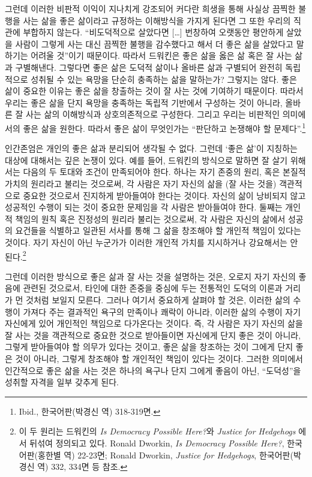 그런데 이러한 비판적 이익이 지나치게 강조되어 커다란 희생을 통해 사실상 끔찍한 불행을 사는 삶을 좋은 삶이라고 규정하는 이해방식을 가지게 된다면 그 또한 우리의 직관에 부합하지 않는다. ``비도덕적으로 살았다면 {[}\ldots{]} 번창하여 오랫동안 평안하게 살았을 사람이 그렇게 사는 대신 끔찍한 불행을 감수했다고 해서 더 좋은 삶을 살았다고 말하기는 어려울 것''이기 때문이다. 따라서 드워킨은 좋은 삶을 옳은 삶 혹은 잘 사는 삶과 구별해낸다. 그렇다면 좋은 삶은 도덕적 삶이나 올바른 삶과 구별되어 완전히 독립적으로 성취될 수 있는 욕망을 단순히 충족하는 삶을 말하는가? 그렇지는 않다. 좋은 삶이 중요한 이유는 좋은 삶을 창출하는 것이 잘 사는 것에 기여하기 때문이다. 따라서 우리는 좋은 삶을 단지 욕망을 충족하는 독립적 기반에서 구성하는 것이 아니라, 올바른 잘 사는 삶의 이해방식과 상호의존적으로 구성한다. 그리고 우리는 비판적인 의미에서의 좋은 삶을 원한다. 따라서 좋은 삶이 무엇인가는 ``판단하고 논쟁해야 할 문제다''.\footnote{Ibid., 한국어판(박경신 역) 318-319면.}

인간존엄은 개인의 좋은 삶과 분리되어 생각될 수 없다. 그런데 `좋은 삶'이 지칭하는 대상에 대해서는 깊은 논쟁이 있다. 예를 들어, 드워킨의 방식으로 말하면 잘 살기 위해서는 다음의 두 토대와 조건이 만족되어야 한다. 하나는 자기 존중의 원리, 혹은 본질적 가치의 원리라고 불리는 것으로써, 각 사람은 자기 자신의 삶을 (잘 사는 것을) 객관적으로 중요한 것으로서 진지하게 받아들여야 한다는 것이다. 자신의 삶이 낭비되지 않고 성공적인 수행이 되는 것이 중요한 문제임을 각 사람은 받아들여야 한다. 둘째는 개인적 책임의 원칙 혹은 진정성의 원리라 불리는 것으로써, 각 사람은 자신의 삶에서 성공의 요건들을 식별하고 일관된 서사를 통해 그 삶을 창조해야 할 개인적 책임이 있다는 것이다. 자기 자신이 아닌 누군가가 이러한 개인적 가치를 지시하거나 강요해서는 안 된다.\footnote{이 두 원리는 드워킨의 \emph{Is Democracy Possible Here?}와 \emph{Justice for Hedgehogs} 에서 뒤섞여 정의되고 있다. Ronald Dworkin, \emph{Is Democracy Possible Here?}, 한국어판(홍한별 역) 22-23면; Ronald Dworkin, \emph{Justice for Hedgehogs}, 한국어판(박경신 역) 332, 334면 등 참조.}

그런데 이러한 방식으로 좋은 삶과 잘 사는 것을 설명하는 것은, 오로지 자기 자신의 좋음에 관련된 것으로서, 타인에 대한 존중을 중심에 두는 전통적인 도덕의 이론과 거리가 먼 것처럼 보일지 모른다. 그러나 여기서 중요하게 살펴야 할 것은, 이러한 삶의 수행이 가져다 주는 결과적인 욕구의 만족이나 쾌락이 아니라, 이러한 삶의 수행이 자기 자신에게 있어 개인적인 책임으로 다가온다는 것이다. 즉, 각 사람은 자기 자신의 삶을 잘 사는 것을 객관적으로 중요한 것으로 받아들이면 자신에게 단지 좋은 것이 아니라, 그렇게 받아들여야 할 의무가 있다는 것이고, 좋은 삶을 창조하는 것이 그에게 단지 좋은 것이 아니라, 그렇게 창조해야 할 개인적인 책임이 있다는 것이다. 그러한 의미에서 인간적으로 좋은 삶을 사는 것은 하나의 욕구나 단지 그에게 좋음이 아닌, ``도덕성''을 성취할 자격을 일부 갖추게 된다.

